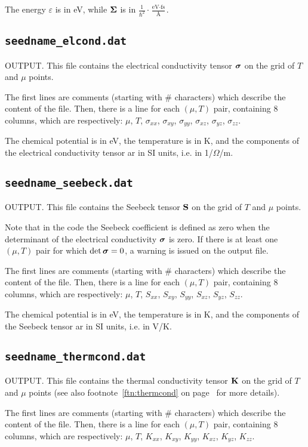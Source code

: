 The energy $\varepsilon$ is in eV, while $\bm{\mathrm{\Sigma}}$ is in 
 $\displaystyle\frac{1}{\hbar^2}\cdot\frac{\text{eV}\cdot\text{fs}}{\text{\AA}}$.

\subsection{{\tt seedname\_elcond.dat}}
OUTPUT. This file contains the electrical conductivity tensor $\bm{\mathrm{\sigma}}$ on the grid of $T$ and $\mu$ points. 

The first lines are comments (starting with \# characters) which describe the content of the file.
Then, there is a line for each $(\mu,T)$ pair, containing 8 columns, which are respectively: $\mu$, $T$, $\sigma_{xx}$, $\sigma_{xy}$, $\sigma_{yy}$, $\sigma_{xz}$, $\sigma_{yz}$, $\sigma_{zz}$.

The chemical potential is in eV, the temperature is in K, and the components of the electrical conductivity tensor ar in SI units, i.e. in 1/$\Omega$/m.
\subsection{{\tt seedname\_seebeck.dat}}
OUTPUT. This file contains the Seebeck tensor $\bm{\mathrm{S}}$ on the grid of $T$ and $\mu$ points. 

Note that in the code the Seebeck coefficient is defined as zero when the determinant of the electrical conductivity $\bm{\mathrm{\sigma}}$ is zero. If there is at least one $(\mu, T)$ pair for which $\det \bm{\mathrm{\sigma}}=0$, a warning is issued on the output file.

The first lines are comments (starting with \# characters) which describe the content of the file.
Then, there is a line for each $(\mu,T)$ pair, containing 8 columns, which are respectively: $\mu$, $T$, $S_{xx}$, $S_{xy}$, $S_{yy}$, $S_{xz}$, $S_{yz}$, $S_{zz}$.

The chemical potential is in eV, the temperature is in K, and the components of the Seebeck tensor ar in SI units, i.e. in V/K.

\subsection{{\tt seedname\_thermcond.dat}}
OUTPUT. This file contains the thermal conductivity tensor $\bm{\mathrm{K}}$ on the grid of $T$ and $\mu$ points (see also footnote~\ref{ftn:thermcond} on page~\pageref{ftn:thermcond} for more details).

The first lines are comments (starting with \# characters) which describe the content of the file.
Then, there is a line for each $(\mu,T)$ pair, containing 8 columns, which are respectively: $\mu$, $T$, $K_{xx}$, $K_{xy}$, $K_{yy}$, $K_{xz}$, $K_{yz}$, $K_{zz}$.

